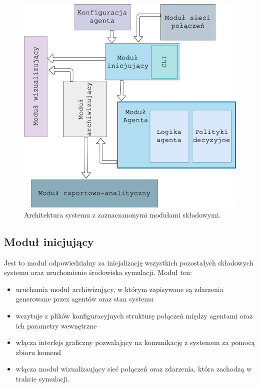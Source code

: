 \documentclass{article}
\begin{document}
\begin{figure}[H]
	\centering
	\includegraphics[width=\textwidth, height=0.7\textheight]{./system-arch.png}
	\caption{Architektura systemu z zaznaczanonymi modułami składowymi.}
	\label{arch1}
\end{figure}

\subsection{Moduł inicjujący}

Jest to moduł odpowiedzialny za inicjalizację wszystkich pozostałych składowych systemu oraz 
uruchomienie środowiska symulacji. Moduł ten:

\begin{itemize}

\item uruchamia moduł archiwizujący, w którym zapisywane są zdarzenia generowane przez agentów oraz stan systemu 
\item wczytuje z plików konfiguracyjnych strukturę połączeń między agentami oraz ich parametry wewnętrzne 
\item włącza interfejs graficzny pozwalający na komunikację z systemem za pomocą zbioru komend  
\item włącza moduł wizualizaujący sieć połączeń oraz zdarzenia, która zachodzą w trakcie symulacji.

\end{itemize}
\end{document}
